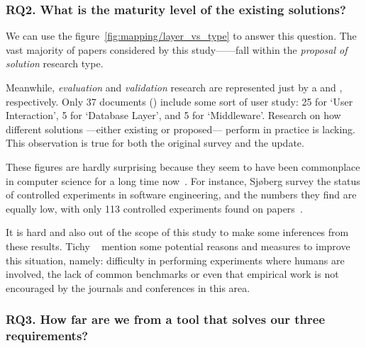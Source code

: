 \subsubsection{RQ2. What is the maturity level of the existing solutions?}
We can use the figure~\ref{fig:mapping/layer_vs_type} to answer this question.
The vast majority of papers considered by this study------fall within the
\emph{proposal of solution} research type.

Meanwhile, \emph{evaluation} and \emph{validation} research are represented
just by a  and , respectively.
Only 37 documents () include some sort of user study:
25 for `User Interaction', 5 for `Database  Layer', and 5 for `Middleware'.
Research on how different solutions ---either existing or proposed--- perform in
practice is lacking. This observation is true for both the original survey and the update.

These figures are hardly surprising because they seem to have been commonplace
in computer science for a long time now~\cite{TICHY1995,ZELKOWITZ1997,Sjoberg2005}.
For instance, Sjøberg \etal survey the status of controlled experiments
in software engineering, and the numbers they find are equally low, with
only 113 controlled experiments found on  papers~\cite{Sjoberg2005}.

It is hard and also out of the scope of this study to make some inferences from these
results. Tichy \etal~\cite{TICHY1995} mention some potential reasons and measures
to improve this situation, namely: difficulty in performing experiments where humans
are involved, the lack of common benchmarks or even that empirical work is not
encouraged by the journals and conferences in this area.

\subsubsection{RQ3. How far are we from a tool that solves our three requirements?}

